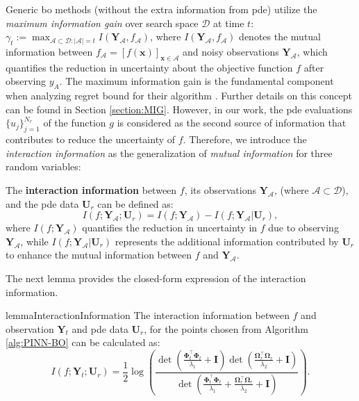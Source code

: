 Generic \ac{bo} methods (without the extra information from \ac{pde}) utilize the \textit{maximum information gain} over search space $\mathcal{D}$ at time $t$:
    $\gamma_t := \max_{\mathcal{A} \subset \mathcal{D}: \lvert \mathcal{A} \rvert=t} I(\mathbf{Y}_\mathcal{A}, f_\mathcal{A})$, 
    where $I(\mathbf{Y}_\mathcal{A}, f_\mathcal{A})$ denotes the mutual information between $f_\mathcal{A} = [f(\mathbf{x})]_{\mathbf{x}\in \mathcal{A}}$ and noisy observations $\mathbf{Y}_\mathcal{A}$, which quantifies the reduction in uncertainty about the objective function $f$ after observing $y_A$. The maximum information gain is the fundamental component when analyzing regret bound for their algorithm \citep{srinivas2009gaussian,vakili2021optimal}. Further details on this concept can be found in Section \ref{section:MIG}. However, in our work, the \ac{pde} evaluations $\{u_j\}_{j=1}^{N_r}$ of the function $g$ is considered as the second source of information that contributes to reduce the uncertainty of $f$. Therefore, we introduce the \textit{interaction information} as the generalization of \textit{mutual information} for three random variables:
\begin{definition}
\label{def:pinn-bo_interaction_information}
The \textbf{interaction information} between $f$,  its observations $\mathbf{Y}_\mathcal{A}$, (where $ \mathcal{A} \subset \mathcal{D}$), and the \ac{pde} data $\mathbf{U}_r$ can be defined as:
\[
I (f; \mathbf{Y}_\mathcal{A}; \mathbf{U}_r) = I (f; \mathbf{Y}_\mathcal{A}) - I (f; \mathbf{Y}_\mathcal{A} \rvert \mathbf{U}_r),
\]
where $I(f; \mathbf{Y}_\mathcal{A})$ quantifies the reduction in uncertainty in $f$ due to observing $\mathbf{Y}_\mathcal{A}$, while $I(f; \mathbf{Y}_\mathcal{A} \rvert \mathbf{U}_r)$ represents the additional information contributed by $\mathbf{U}_r$ to enhance the mutual information between $f$ and $\mathbf{Y}_\mathcal{A}$. 
\end{definition}
The next lemma provides the closed-form expression of the interaction information. 
\begin{restatable}{lemma}{InteractionInformation} 
    \label{lemma:pinn-bo_interaction_information_formula}
    The interaction information between $f$ and observation $\mathbf{Y}_t$ and \ac{pde} data $\mathbf{U}_r$, for the points chosen from Algorithm \ref{alg:PINN-BO} can be calculated as:
    \begin{equation*}
        I (f; \mathbf{Y}_t; \mathbf{U}_r) = \frac{1}{2}  \log (\frac{\det(\frac{\boldsymbol{\Phi}_t^\top \boldsymbol{\Phi}_t}{\lambda_1} + \mathbf{I})\det(\frac{\boldsymbol{\Omega}_r^\top \boldsymbol{\Omega}_r}{\lambda_2} + \mathbf{I})}{\det(\frac{\boldsymbol{\Phi}_t^\top \boldsymbol{\Phi}_t}{\lambda_1} + \frac{\boldsymbol{\Omega}_r^\top \boldsymbol{\Omega}_r}{\lambda_2} + \mathbf{I})}).
    \end{equation*}
\end{restatable}

